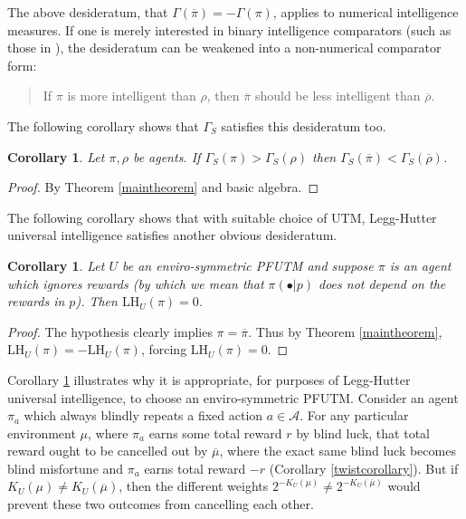 \documentclass{article}
\newtheorem{corollary}[theorem]{Corollary}
\def\LH{\textrm{LH}}
\def\SYM{S}
\begin{document}
The above desideratum, that $\Gamma(\overline\pi)=-\Gamma(\pi)$, applies to
numerical intelligence measures. If one is merely interested in binary
intelligence comparators (such as those in \cite{alexander2019intelligence}),
the desideratum can be weakened into a non-numerical comparator form:
\begin{quote}
    If $\pi$ is more intelligent than $\rho$,
    then $\overline\pi$ should be less intelligent than $\overline\rho$.
\end{quote}
The following corollary shows that $\Gamma_{\SYM}$ satisfies this desideratum too.

\begin{corollary}
\label{comparatorcorollary}
    Let $\pi,\rho$ be agents. If $\Gamma_{\SYM}(\pi)>\Gamma_{\SYM}(\rho)$
    then $\Gamma_{\SYM}(\overline\pi)<\Gamma_{\SYM}(\overline\rho)$.
\end{corollary}

\begin{proof}
    By Theorem \ref{maintheorem} and basic algebra.
\end{proof}

The following corollary shows that with suitable choice of UTM,
Legg-Hutter universal intelligence satisfies another obvious desideratum.

\begin{corollary}
\label{ignoringrewardscorollary}
    Let $U$ be an enviro-symmetric PFUTM and
    suppose $\pi$ is an agent which ignores rewards (by which we mean that
    $\pi(\bullet|p)$ does not depend on the rewards in $p$).
    Then $\LH_U(\pi)=0$.
\end{corollary}

\begin{proof}
    The hypothesis clearly implies $\pi=\overline\pi$. Thus by Theorem
    \ref{maintheorem}, $\LH_U(\pi)=-\LH_U(\pi)$,
    forcing $\LH_U(\pi)=0$.
\end{proof}

Corollary \ref{ignoringrewardscorollary} illustrates why it is appropriate, for
purposes of Legg-Hutter universal intelligence, to choose an enviro-symmetric PFUTM.
Consider an agent $\pi_a$
which always blindly repeats a fixed action $a\in\mathcal A$.
For any particular environment $\mu$,
where $\pi_a$ earns some total reward $r$ by blind luck,
that total reward ought to be cancelled out by $\overline\mu$, where
the exact same blind luck becomes blind misfortune and $\pi_a$ earns total reward
$-r$ (Corollary \ref{twistcorollary}). But if $K_U(\mu)\not=K_U(\overline\mu)$,
then the different weights $2^{-K_U(\mu)}\not=2^{-K_U(\overline\mu)}$ would prevent
these two outcomes from cancelling each other.
\end{document}
